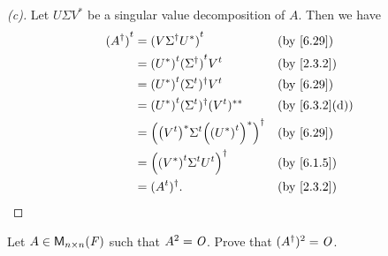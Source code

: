 \begin{proof}[(c)]
  Let \(U \Sigma V^*\) be a singular value decomposition of \(A\).
  Then we have
  \begin{align*}
    \tp{(A^{\dag})} & = \tp{(V \Sigma^{\dag} U^*)}                              &  & \by{6.29}     \\
                    & = \tp{(U^*)} \tp{(\Sigma^{\dag})} \tp{V}                  &  & \by{2.3.2}    \\
                    & = \tp{(U^*)} (\tp{\Sigma})^{\dag} \tp{V}                  &  & \by{6.29}     \\
                    & = \tp{(U^*)} (\tp{\Sigma})^{\dag} (\tp{V})^{**}           &  & \by{6.3.2}[d] \\
                    & = \pa{\pa{\tp{V}}^* \tp{\Sigma} \pa{\tp{(U^*)}}^*}^{\dag} &  & \by{6.29}     \\
                    & = \pa{\tp{\pa{V^*}} \tp{\Sigma} \tp{U}}^{\dag}            &  & \by{6.1.5}    \\
                    & = (\tp{A})^{\dag}.                                        &  & \by{2.3.2}
  \end{align*}
\end{proof}

\begin{ex}\label{ex:6.7.20}
  Let \(A \in \ms[n][n][\F]\) such that \(A^2 = \mathit{O}\).
  Prove that \((A^{\dag})^2 = \mathit{O}\).
\end{ex}

